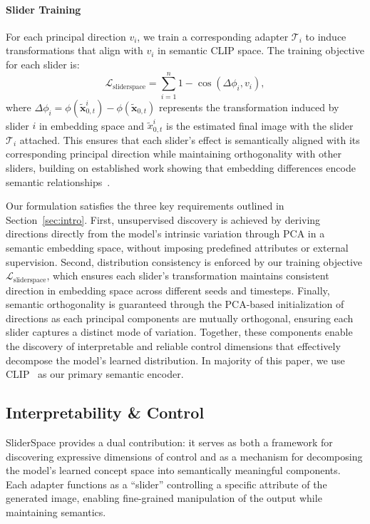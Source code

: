 \paragraph{Slider Training}
For each principal direction $v_i$, we train a corresponding adapter $\mathcal{T}_i$ to induce transformations that align with $v_i$ in semantic CLIP space. The training objective for each slider is:
\begin{equation}
\label{eq:contrast}
    \mathcal{L}_{\text{sliderspace}} = \sum_{i=1}^n 1 - \cos(\Delta\phi_i, v_i),
\end{equation}
where $\Delta\phi_i = \phi(\tilde{\mathbf{x}}_{0,t}^i) - \phi(\tilde{\mathbf{x}}_{0,t})$ represents the transformation induced by slider $i$ in embedding space and $\tilde{x}_{0,t}^i$ is the estimated final image with the slider $\mathcal{T}_i$ attached. This ensures that each slider's effect is semantically aligned with its corresponding principal direction while maintaining orthogonality with other sliders, building on established work showing that embedding differences encode semantic relationships~\cite{gal2022stylegan, patashnik2021styleclip}. 

Our formulation satisfies the three key requirements outlined in Section~\ref{sec:intro}. First, unsupervised discovery is achieved by deriving directions directly from the model's intrinsic variation through PCA in a semantic embedding space, without imposing predefined attributes or external supervision. Second, distribution consistency is enforced by our training objective $\mathcal{L}_{\text{sliderspace}}$, which ensures each slider's transformation maintains consistent direction in embedding space across different seeds and timesteps. Finally, semantic orthogonality is guaranteed through the PCA-based initialization of directions as each principal components are mutually orthogonal, ensuring each slider captures a distinct mode of variation. Together, these components enable the discovery of interpretable and reliable control dimensions that effectively decompose the model's learned distribution. In majority of this paper, we use CLIP~\cite{radford2021learning} as our primary semantic encoder.



\subsection{Interpretability \& Control}

SliderSpace provides a dual contribution: it serves as both a framework for discovering expressive dimensions of control and as a mechanism for decomposing the model's learned concept space into semantically meaningful components. Each adapter functions as a ``slider'' controlling a specific attribute of the generated image, enabling fine-grained manipulation of the output while maintaining semantics.

